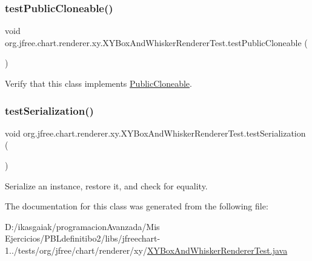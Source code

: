 \subsubsection{\texorpdfstring{test\+Public\+Cloneable()}{testPublicCloneable()}}
{\footnotesize\ttfamily void org.\+jfree.\+chart.\+renderer.\+xy.\+X\+Y\+Box\+And\+Whisker\+Renderer\+Test.\+test\+Public\+Cloneable (\begin{DoxyParamCaption}{ }\end{DoxyParamCaption})}

Verify that this class implements \mbox{\hyperlink{}{Public\+Cloneable}}. \mbox{\label{classorg_1_1jfree_1_1chart_1_1renderer_1_1xy_1_1_x_y_box_and_whisker_renderer_test_a605bf62fd4ba9be55e17493dad5f9693}} 
\subsubsection{\texorpdfstring{test\+Serialization()}{testSerialization()}}
{\footnotesize\ttfamily void org.\+jfree.\+chart.\+renderer.\+xy.\+X\+Y\+Box\+And\+Whisker\+Renderer\+Test.\+test\+Serialization (\begin{DoxyParamCaption}{ }\end{DoxyParamCaption})}

Serialize an instance, restore it, and check for equality. 

The documentation for this class was generated from the following file\+:\begin{DoxyCompactItemize}
\item 
D\+:/ikasgaiak/programacion\+Avanzada/\+Mis Ejercicios/\+P\+B\+Ldefinitibo2/libs/jfreechart-\/1../tests/org/jfree/chart/renderer/xy/\mbox{\hyperlink{_x_y_box_and_whisker_renderer_test_8java}{X\+Y\+Box\+And\+Whisker\+Renderer\+Test.\+java}}\end{DoxyCompactItemize}
